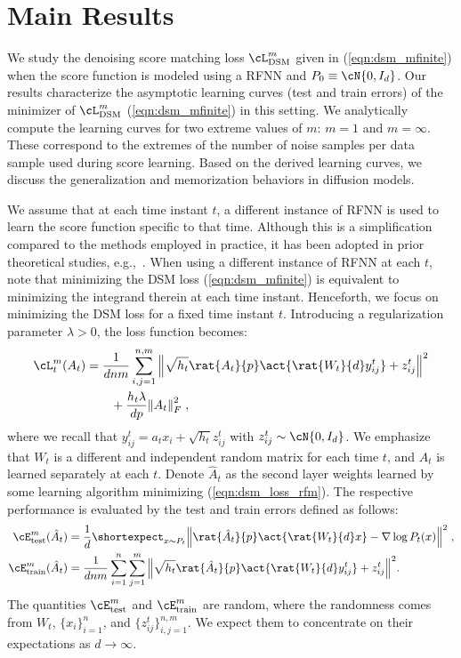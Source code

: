 \section{Main Results}\label{sec:main_results}
We study the denoising score matching loss $\cL_{\text{DSM}}^m$ given in (\ref{eqn:dsm_mfinite}) when the score function is modeled using a RFNN and $P_0\equiv\cN{0,I_d}$. %
Our results characterize the asymptotic learning curves (test and train errors) of the minimizer of $\cL_{\text{DSM}}^m$ (\ref{eqn:dsm_mfinite}) in this setting. We analytically compute the learning curves for two extreme values of $m$: $m=1$ and $m=\infty$. These correspond to the extremes of the number of noise samples per data sample used during score learning. Based on the derived learning curves, we discuss the generalization and memorization behaviors in diffusion models.%

We assume that at each time instant $t$, a different instance of RFNN is used to learn the score function specific to that time. Although this is a simplification compared to the methods employed in practice, it has been adopted in prior theoretical studies, e.g.,~\cite{cui_analysis_2023}. When using a different instance of RFNN at each $t$, note that minimizing the DSM loss (\ref{eqn:dsm_mfinite}) is equivalent to minimizing the integrand therein at each time instant. Henceforth, we focus on minimizing the DSM loss for a fixed time instant $t$. Introducing a regularization parameter $\lambda>0$, the loss function becomes:
\begin{align}\label{eqn:dsm_loss_rfm}
    \cL_t^m(A_t) &= \frac{1}{dnm}\sum_{i,j=1}^{n,m}{\norm{\sqrt{h_t}\rat{A_t}{p}\act{\rat{W_t}{d}y^t_{ij}}+z^t_{ij}}^2}\nonumber\\
    &\qquad+\frac{h_t\lambda}{dp}\norm{A_t}_F^2 \;,
\end{align}
where we recall that $y^t_{ij} = a_tx_i+\sqrt{h_t}z^t_{ij}$ with $z^t_{ij}\sim\cN{0,I_d}$. We emphasize that $W_t$ is a different and independent random matrix for each time $t$, and $A_t$ is learned separately at each $t$.
Denote $\hat{A}_t$ as the second layer weights learned by some learning algorithm minimizing (\ref{eqn:dsm_loss_rfm}). The respective performance is evaluated by the test and train errors defined as follows:
\begin{align*}
    \cE^m_{\text{test}}(\hat{A}_t) &= \frac{1}{d}\shortexpect_{x\sim P_t}{\norm{\rat{\hat{A}_t}{p}\act{\rat{W_t}{d}x}-\nabla\log P_t(x)}^2}\;,\\
    \cE^m_{\text{train}}(\hat{A}_t) &= \frac{1}{dnm}\sum_{i=1}^{n}{\sum_{j=1}^{m}\norm{\sqrt{h_t}\rat{\hat{A}_t}{p}\act{\rat{W_t}{d}y^t_{ij}}+z^t_{ij}}^2}.
\end{align*}
The quantities $\cE^m_{\text{test}}$ and $\cE^m_{\text{train}}$ are random, where the randomness comes from $W_t$, $\{x_i\}_{i=1}^n$, and $\{z^t_{ij}\}_{i,j=1}^{n,m}$. We expect them to concentrate on their expectations as $d\to\infty$.  

